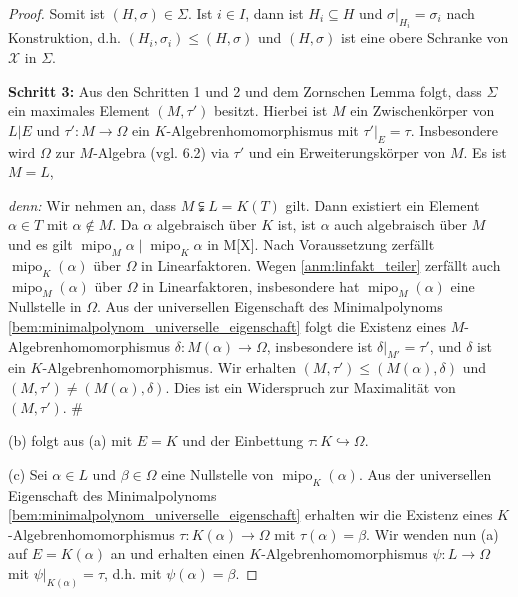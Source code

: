\documentclass[a4paper, twoside, 11pt, ngerman]{report}
\newcommand{\calX}{\mathcal X}
\DeclareMathOperator{\mipo}{mipo}
\theoremstyle{definistyle}
\theoremstyle{remark}
\newenvironment{denn}%
  {\par\textit{denn:}}%
  {\hfill\#\par}
\begin{document}
\begin{proof}
Somit ist $(H, \sigma) \in \Sigma$. Ist $i\in I$, dann ist $H_i \subseteq H$ und $\sigma|_{H_i} = \sigma_i$ nach Konstruktion, d.h. $(H_i, \sigma_i) \leq (H, \sigma)$ und $(H, \sigma)$ ist eine obere Schranke von $\calX$ in $\Sigma$.

\textbf{Schritt 3:} Aus den Schritten 1 und 2 und dem Zornschen Lemma folgt, dass 
$\Sigma$ ein maximales Element $(M, \tau')$ besitzt. Hierbei ist $M$ ein Zwischenkörper von $L|E$ und $\tau' \colon M \to \Omega$ ein $K$-Algebrenhomomorphismus mit $\tau'|_E = \tau$. Insbesondere wird $\Omega$ zur $M$-Algebra (vgl. 6.2) via $\tau'$ und ein Erweiterungskörper von $M$. Es ist $M = L$,
\begin{denn}
Wir nehmen an, dass $M\subsetneqq L=K(T)$ gilt. Dann existiert ein Element $\alpha\in T$ mit $\alpha\not\in M$.
Da $\alpha$ algebraisch über $K$ ist, ist $\alpha$ auch algebraisch über $M$ und es gilt $\mipo_M\alpha\mid\mipo_K\alpha$
in M[X]. Nach Voraussetzung zerfällt $\operatorname{mipo}_K(\alpha)$ über $\Omega$ in Linearfaktoren. 
Wegen \ref{anm:linfakt_teiler} zerfällt auch $\operatorname{mipo}_M(\alpha)$ über $\Omega$ in Linearfaktoren,
insbesondere hat $\operatorname{mipo}_M(\alpha)$ eine Nullstelle in $\Omega$. Aus der universellen Eigenschaft des Minimalpolynoms \ref{bem:minimalpolynom_universelle_eigenschaft} folgt die Existenz eines 
$M$-Algebrenhomomorphismus $\delta \colon M(\alpha) \to \Omega$, insbesondere ist $\delta|_{M'}=\tau'$, und $\delta$
ist ein $K$-Algebrenhomomorphismus. Wir erhalten $(M,\tau')\leq(M(\alpha),\delta)$ und $(M,\tau')\neq(M(\alpha),\delta)$.
Dies ist ein Widerspruch zur Maximalität von $(M,\tau')$.
\end{denn}
(b) folgt aus (a) mit $E = K$ und der Einbettung $\tau\colon K\hookrightarrow\Omega$.

(c) Sei $\alpha\in L$ und $\beta\in\Omega$ eine Nullstelle von $\mipo_K(\alpha)$.
Aus der universellen Eigenschaft des Minimalpolynoms \ref{bem:minimalpolynom_universelle_eigenschaft} erhalten wir die Existenz eines $K$-Algebrenhomomorphismus $\tau\colon K(\alpha)\to\Omega$ mit $\tau(\alpha)=\beta$.
Wir wenden nun (a) auf $E=K(\alpha)$ an und erhalten einen $K$-Algebrenhomomorphismus $\psi \colon L \to \Omega$ mit $\psi|_{K(\alpha)} = \tau$, d.h. mit $\psi(\alpha) = \beta$.
\end{proof}
\end{document}
